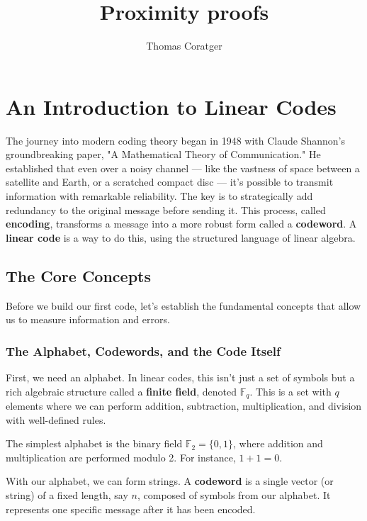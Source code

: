 \documentclass{article}
\title{Proximity proofs}
\author{Thomas Coratger}
\date{}
\begin{document}
\maketitle


\section{An Introduction to Linear Codes}

The journey into modern coding theory began in 1948 with Claude Shannon's groundbreaking paper, "A Mathematical Theory of Communication." He established that even over a noisy channel — like the vastness of space between a satellite and Earth, or a scratched compact disc — it's possible to transmit information with remarkable reliability. The key is to strategically add redundancy to the original message before sending it. This process, called \textbf{encoding}, transforms a message into a more robust form called a \textbf{codeword}. A \textbf{linear code} is a way to do this, using the structured language of linear algebra.

\subsection{The Core Concepts}

Before we build our first code, let's establish the fundamental concepts that allow us to measure information and errors.

\subsubsection{The Alphabet, Codewords, and the Code Itself}

First, we need an alphabet. In linear codes, this isn't just a set of symbols but a rich algebraic structure called a \textbf{finite field}, denoted $\mathbb{F}_q$. This is a set with $q$ elements where we can perform addition, subtraction, multiplication, and division with well-defined rules. 

\begin{tcolorbox}[title=Example: The Binary Field $\mathbb{F}_2$]
The simplest alphabet is the binary field $\mathbb{F}_2 = \{0, 1\}$, where addition and multiplication are performed modulo 2. For instance, $1+1=0$.
\end{tcolorbox}

With our alphabet, we can form strings. A \textbf{codeword} is a single vector (or string) of a fixed length, say $n$, composed of symbols from our alphabet. It represents one specific message after it has been encoded.
\end{document}

